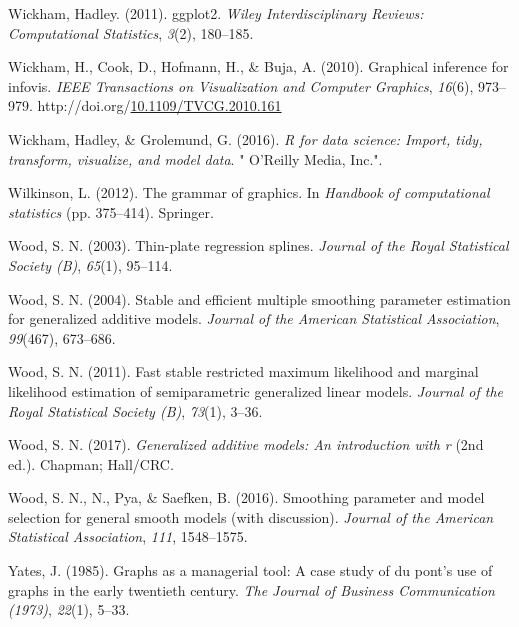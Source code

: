 \documentclass[print]{nuthesis}
\newlength{\cslhangindent}
\newenvironment{CSLReferences}%
{\setlength{\parindent}{0pt}%
\everypar{\setlength{\hangindent}{\cslhangindent}}\ignorespaces}%
{\par}
\begin{document}
\begin{CSLReferences}{1}{0}
\leavevmode\hypertarget{ref-wickham2011ggplot2}{}%
Wickham, Hadley. (2011). ggplot2. \emph{Wiley Interdisciplinary Reviews: Computational Statistics}, \emph{3}(2), 180--185.

\leavevmode\hypertarget{ref-wickham_graphical_2010}{}%
Wickham, H., Cook, D., Hofmann, H., \& Buja, A. (2010). Graphical inference for infovis. \emph{IEEE Transactions on Visualization and Computer Graphics}, \emph{16}(6), 973--979. http://doi.org/\href{https://doi.org/10.1109/TVCG.2010.161}{10.1109/TVCG.2010.161}

\leavevmode\hypertarget{ref-wickham2016r}{}%
Wickham, Hadley, \& Grolemund, G. (2016). \emph{R for data science: Import, tidy, transform, visualize, and model data}. " O'Reilly Media, Inc.".

\leavevmode\hypertarget{ref-wilkinson2012grammar}{}%
Wilkinson, L. (2012). The grammar of graphics. In \emph{Handbook of computational statistics} (pp. 375--414). Springer.

\leavevmode\hypertarget{ref-mgcv5}{}%
Wood, S. N. (2003). Thin-plate regression splines. \emph{Journal of the Royal Statistical Society (B)}, \emph{65}(1), 95--114.

\leavevmode\hypertarget{ref-mgcv3}{}%
Wood, S. N. (2004). Stable and efficient multiple smoothing parameter estimation for generalized additive models. \emph{Journal of the American Statistical Association}, \emph{99}(467), 673--686.

\leavevmode\hypertarget{ref-mgcv1}{}%
Wood, S. N. (2011). Fast stable restricted maximum likelihood and marginal likelihood estimation of semiparametric generalized linear models. \emph{Journal of the Royal Statistical Society (B)}, \emph{73}(1), 3--36.

\leavevmode\hypertarget{ref-mgcv4}{}%
Wood, S. N. (2017). \emph{Generalized additive models: An introduction with r} (2nd ed.). Chapman; Hall/CRC.

\leavevmode\hypertarget{ref-mgcv2}{}%
Wood, S. N., N., Pya, \& Saefken, B. (2016). Smoothing parameter and model selection for general smooth models (with discussion). \emph{Journal of the American Statistical Association}, \emph{111}, 1548--1575.

\leavevmode\hypertarget{ref-yates1985graphs}{}%
Yates, J. (1985). Graphs as a managerial tool: A case study of du pont's use of graphs in the early twentieth century. \emph{The Journal of Business Communication (1973)}, \emph{22}(1), 5--33.

\end{CSLReferences}
\end{document}

